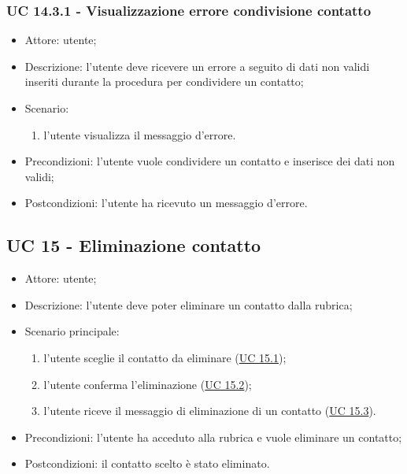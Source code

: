 \subsubsection{UC 14.3.1 - Visualizzazione errore condivisione contatto} \label{sec: UC 14.3.1}
\begin{itemize}
    \item Attore: utente;
    \item Descrizione: l'utente deve ricevere un errore a seguito di dati non validi inseriti durante la procedura per condividere un contatto;
    \item Scenario:
        \begin{enumerate}
        \item l'utente visualizza il messaggio d'errore.
        \end{enumerate}
    
    \item Precondizioni: l'utente vuole condividere un contatto e inserisce dei dati non validi;
    \item Postcondizioni: l'utente ha ricevuto un messaggio d'errore.
\end{itemize}



\subsection{UC 15 - Eliminazione contatto}
\begin{itemize}
    \item Attore: utente;
    \item Descrizione: l'utente deve poter eliminare un contatto dalla rubrica;
    \item Scenario principale:
        \begin{enumerate}
        \item l'utente sceglie il contatto da eliminare (\hyperref[sec: UC 15.1]{UC 15.1});
        \item l'utente conferma l'eliminazione (\hyperref[sec: UC 15.2]{UC 15.2});
        \item l'utente riceve il messaggio di eliminazione di un contatto (\hyperref[sec: UC 15.3]{UC 15.3}).
        \end{enumerate}
    \item Precondizioni: l'utente ha acceduto alla rubrica e vuole eliminare un contatto;
    \item Postcondizioni: il contatto scelto è stato eliminato.
\end{itemize}

